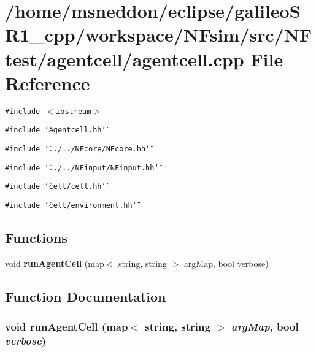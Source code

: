\section{/home/msneddon/eclipse/galileoSR1\_\-cpp/workspace/NFsim/src/NFtest/agentcell/agentcell.cpp File Reference}
\label{agentcell_8cpp}


{\tt \#include $<$iostream$>$}\par
{\tt \#include \char`\"{}agentcell.hh\char`\"{}}\par
{\tt \#include \char`\"{}../../NFcore/NFcore.hh\char`\"{}}\par
{\tt \#include \char`\"{}../../NFinput/NFinput.hh\char`\"{}}\par
{\tt \#include \char`\"{}cell/cell.hh\char`\"{}}\par
{\tt \#include \char`\"{}cell/environment.hh\char`\"{}}\par
\subsection*{Functions}
\begin{CompactItemize}
\item 
void {\bf runAgentCell} (map$<$ string, string $>$ argMap, bool verbose)
\end{CompactItemize}


\subsection{Function Documentation}
\subsubsection{\setlength{\rightskip}{0pt plus 5cm}void runAgentCell (map$<$ string, string $>$ {\em argMap}, bool {\em verbose})}\label{agentcell_8cpp_b3bca48acc52c98af56e755d0d017b31}


